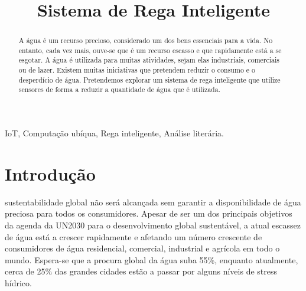 \documentclass[conference]{IEEEtran}
\begin{document}
\title{Sistema de Rega Inteligente}

\author{
\and
{}
}

\maketitle

\begin{abstract}
A água é um recurso precioso, considerado um dos bens essenciais para a vida. 
No entanto, cada vez mais, ouve-se que é um recurso escasso e que rapidamente está a se esgotar. 
A água é utilizada para muitas atividades, sejam elas industriais, comerciais ou de lazer. 
Existem muitas iniciativas que pretendem reduzir o consumo e o desperdício de água. 
Pretendemos explorar um sistema de rega inteligente que utilize sensores de forma a 
reduzir a quantidade de água que é utilizada. \\
\end{abstract}

\begin{IEEEkeywords}
IoT, Computação ubíqua, Rega inteligente, Análise literária.
\end{IEEEkeywords}

\section{Introdução}
 sustentabilidade global não será alcançada sem garantir a 
disponibilidade de água preciosa para todos os consumidores. Apesar de ser um 
dos principais objetivos da agenda da UN2030 para o desenvolvimento global sustentável, 
a atual escassez de água está a crescer rapidamente e afetando um número crescente de consumidores 
de água residencial, comercial, industrial e agrícola em todo o mundo. Espera-se que a procura 
global da água suba 55\%, enquanto atualmente, cerca de 25\% das grandes cidades estão a passar 
por alguns níveis de stress hídrico. 
\end{document}
